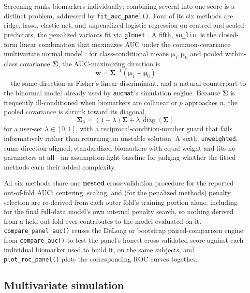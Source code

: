 \documentclass[11pt,a4paper]{article}
\begin{document}
Screening ranks biomarkers individually; combining several into one score
is a distinct problem, addressed by \texttt{fit\_auc\_panel()}.  Four of its
six methods are ridge, lasso, elastic-net, and unpenalized logistic
regression on centred and scaled predictors, the penalized variants fit via
\texttt{glmnet} \citep{Friedman2010}.  A fifth, \texttt{su\_liu}, is the
closed-form linear combination that maximizes AUC under the common-covariance
multivariate normal model \citep{Su1993}: for class-conditional means
$\bm{\mu}_1, \bm{\mu}_0$ and pooled within-class covariance $\bm{\Sigma}$,
the AUC-maximizing direction is
\begin{equation}\label{eq:su_liu}
\mathbf{w} = \bm{\Sigma}^{-1} (\bm{\mu}_1 - \bm{\mu}_0)
\end{equation}
---the same direction as Fisher's linear discriminant, and a natural
counterpart to the binormal model already used by \texttt{aucmat}'s
simulation engine.  Because $\bm{\Sigma}$ is frequently ill-conditioned when
biomarkers are collinear or $p$ approaches $n$, the pooled covariance is
shrunk toward its diagonal,
\begin{equation}\label{eq:shrinkage}
\bm{\Sigma}_\lambda = (1-\lambda)\bm{\Sigma} +
\lambda\,\operatorname{diag}(\bm{\Sigma})
\end{equation}
for a user-set $\lambda \in [0,1]$, with a reciprocal-condition-number guard
that fails informatively rather than returning an unstable solution.  A
sixth, \texttt{unweighted}, sums direction-aligned, standardized biomarkers
with equal weight and fits no parameters at all---an assumption-light
baseline for judging whether the fitted methods earn their added complexity.

All six methods share one \textbf{nested} cross-validation procedure for the
reported out-of-fold AUC: centering, scaling, and (for the penalized methods)
penalty selection are re-derived from each outer fold's training portion
alone, including for the final full-data model's own internal penalty search,
so nothing derived from a held-out fold ever contributes to the model
evaluated on it.  \texttt{compare\_panel\_auc()} reuses the DeLong or
bootstrap paired-comparison engine from \texttt{compare\_auc()} to test the
panel's honest cross-validated score against each individual biomarker used
to build it, on the same subjects, and \texttt{plot\_roc\_panel()} plots the
corresponding ROC curves together.

\subsection{Multivariate simulation}
\end{document}

